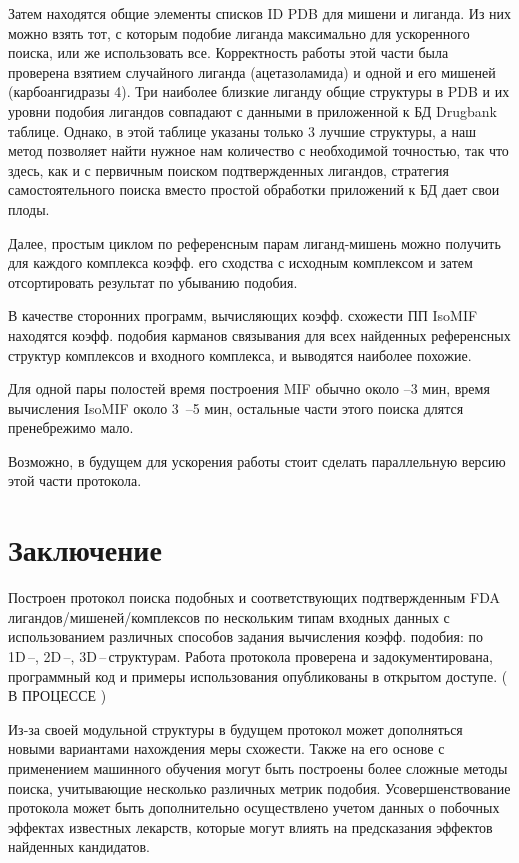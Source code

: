 \documentclass[a4paper,14pt]{article}         %
\newcommand{\sic}[1]{\LARGE\color{orange}{#1}\color{black}\Large}
\begin{document}
Затем находятся общие элементы списков ID PDB для мишени и лиганда. Из них можно взять тот, с которым подобие лиганда максимально для ускоренного поиска, или же использовать все. Корректность работы этой части была проверена взятием случайного лиганда (ацетазоламида) и одной и его мишеней (карбоангидразы 4). Три наиболее близкие лиганду общие структуры в PDB и их уровни подобия лигандов совпадают с данными в приложенной к БД Drugbank таблице. Однако, в этой таблице указаны только 3 лучшие структуры, а наш метод позволяет найти нужное нам количество с необходимой точностью, так что здесь, как и с первичным поиском подтвержденных лигандов, стратегия самостоятельного поиска вместо простой обработки приложений к БД дает свои плоды.

Далее, простым циклом по референсным парам лиганд-мишень можно получить для каждого комплекса коэфф. его сходства с исходным комплексом и затем отсортировать результат по убыванию подобия.

В качестве сторонних программ, вычисляющих коэфф. схожести ПП IsoMIF находятся коэфф. подобия карманов связывания для всех найденных референсных структур комплексов и входного комплекса, и выводятся наиболее похожие.

\sic{ПРИМЕР}

Для одной пары полостей время построения MIF обычно около --3 мин, время вычисления IsoMIF около 3~--5 мин, остальные части этого поиска длятся пренебрежимо мало.

Возможно, в будущем для ускорения работы стоит сделать параллельную версию этой части протокола.

\newpage
\section{Заключение}
Построен протокол поиска подобных и соответствующих подтвержденным FDA лигандов/мишеней/комплексов по нескольким типам входных данных с использованием различных способов задания вычисления коэфф. подобия: по 1D\,--, 2D\,--, 3D\,--\,структурам. Работа протокола проверена и задокументирована, программный код и примеры использования опубликованы в открытом доступе. (\color{orange} В ПРОЦЕССЕ \color{black})

Из-за своей модульной структуры в будущем протокол может дополняться новыми вариантами нахождения меры схожести. Также на его основе с применением машинного обучения могут быть построены более сложные методы поиска, учитывающие несколько различных метрик подобия. Усовершенствование протокола может быть дополнительно осуществлено учетом данных о побочных эффектах известных лекарств, которые могут влиять на предсказания эффектов найденных кандидатов.


\newpage
\printbibliography[heading=bibintoc, title=Список использованных источников]
\end{document}
